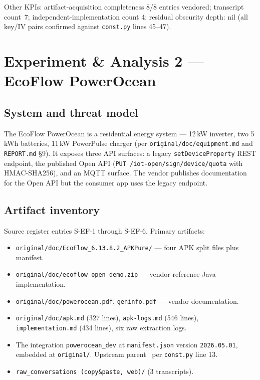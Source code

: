 \documentclass[11pt,a4paper]{article}
\begin{document}
Other KPIs: artifact-acquisition completeness 8/8 entries vendored;
transcript count~7; independent-implementation count 4; residual
obscurity depth: nil (all key/IV pairs confirmed against
\texttt{const.py} lines 45--47).

\section{Experiment \& Analysis 2 --- EcoFlow PowerOcean}
\label{sec:case-ecoflow}

\subsection{System and threat model}
\label{sec:ef-threat-model}
The EcoFlow PowerOcean is a residential energy system --- 12\,kW inverter,
two 5\,kWh batteries, 11\,kW PowerPulse charger (per
\texttt{original/doc/equipment.md} and \texttt{REPORT.md} \S 9). It exposes
three API surfaces: a legacy \texttt{setDeviceProperty} REST endpoint, the
published Open API (\texttt{PUT /iot-open/sign/device/quota} with
HMAC-SHA256), and an MQTT surface. The vendor publishes documentation for
the Open API but the consumer app uses the legacy endpoint.

\subsection{Artifact inventory}
\label{sec:ef-artifacts}
Source register entries S-EF-1 through S-EF-6. Primary artifacts:
\begin{itemize}
  \item \texttt{original/doc/EcoFlow\_6.13.8.2\_APKPure/} --- four APK split
        files plus manifest.
  \item \texttt{original/doc/ecoflow-open-demo.zip} --- vendor reference
        Java implementation.
  \item \texttt{original/doc/powerocean.pdf}, \texttt{geninfo.pdf} ---
        vendor documentation.
  \item \texttt{original/doc/apk.md} (327 lines), \texttt{apk-logs.md}
        (546 lines), \texttt{implementation.md} (434 lines), six raw
        extraction logs.
  \item The integration \texttt{powerocean\_dev} at \texttt{manifest.json}
        version \texttt{2026.05.01}, embedded at \texttt{original/}.
        Upstream parent~\citep{niltrip_powerocean} per
        \texttt{const.py} line 13.
  \item \texttt{raw\_conversations (copy\&paste, web)/} (3 transcripts).
\end{itemize}
\end{document}
